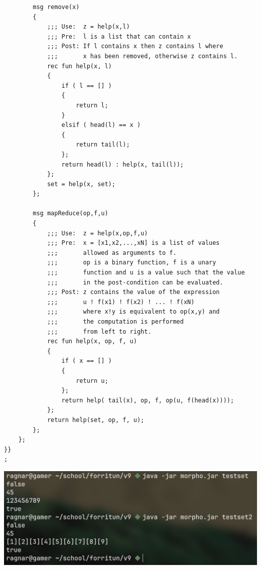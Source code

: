 \documentclass{article}
\begin{document}
\begin{verbatim}
        msg remove(x)
        {
            ;;; Use:  z = help(x,l)
            ;;; Pre:  l is a list that can contain x
            ;;; Post: If l contains x then z contains l where
            ;;;       x has been removed, otherwise z contains l.
            rec fun help(x, l)
            {
                if ( l == [] )
                {
                    return l;
                }
                elsif ( head(l) == x )
                {
                    return tail(l);
                };
                return head(l) : help(x, tail(l));
            };
            set = help(x, set);
        };
        
        msg mapReduce(op,f,u)
        {
            ;;; Use:  z = help(x,op,f,u)
            ;;; Pre:  x = [x1,x2,...,xN] is a list of values 
            ;;;       allowed as arguments to f.
            ;;;       op is a binary function, f is a unary
            ;;;       function and u is a value such that the value
            ;;;       in the post-condition can be evaluated.
            ;;; Post: z contains the value of the expression 
            ;;;       u ! f(x1) ! f(x2) ! ... ! f(xN)
            ;;;       where x!y is equivalent to op(x,y) and
            ;;;       the computation is performed
            ;;;       from left to right.
            rec fun help(x, op, f, u)
            {
                if ( x == [] )
                {
                    return u;
                };
                return help( tail(x), op, f, op(u, f(head(x))));
            };
            return help(set, op, f, u);
        };
    };
}}
;
	\end{verbatim}
	\begin{center}
		\includegraphics[scale=0.35]{set.png}
	\end{center}
	
\end{document}
